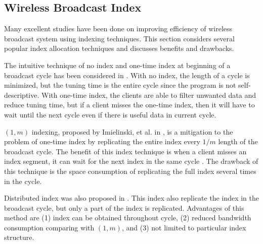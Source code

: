 \documentclass{sig-alternate}
\begin{document}
\subsection{Wireless Broadcast Index}\label{sec:wireless_bcast_index}
Many excellent studies have been done on improving efficiency of wireless
broadcast system using indexing techniques. This section considers several
popular index allocation techniques and discusses benefits and drawbacks.

The intuitive technique of no index and one-time index at beginning of
a broadcast cycle has been considered in \cite{data_on_air}. With no
index, the length of a cycle is minimized, but the tuning time is the
entire cycle since the program is not self-descriptive. With one-time
index, the clients are able to filter unwanted data and reduce tuning
time, but if a client misses the one-time index, then it will have to
wait until the next cycle even if there is useful data in current cycle.

$(1, m)$ indexing, proposed by Imielinski, et al. in \cite{data_on_air},
is a mitigation to the problem of one-time index by replicating the entire
index every $1/m$ length of the broadcast cycle. The benefit of this
index technique is when a client misses an index segment, it can wait for
the next index in the same cycle \cite{DBLP:journals/tmc/KuZW08}.
The drawback of this technique is the space consumption of replicating
the full index several times in the cycle.

Distributed index was also proposed in \cite{data_on_air}. This index
also replicate the index in the broadcast cycle, but only a part of
the index is replicated. Advantages of this method are (1) index
can be obtained throughout cycle, (2) reduced bandwidth consumption
comparing with $(1, m)$, and (3) not limited to particular index
structure.


\end{document}
